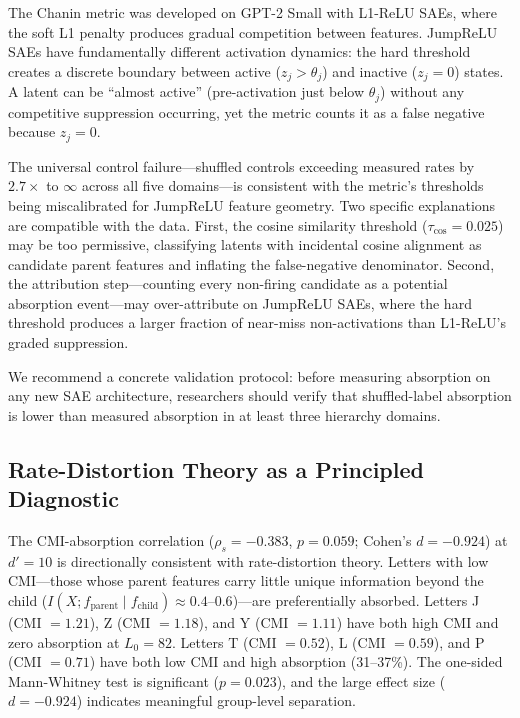 \documentclass{article}
\begin{document}
The Chanin metric was developed on GPT-2 Small with L1-ReLU SAEs, where the soft L1 penalty produces gradual competition between features. JumpReLU SAEs have fundamentally different activation dynamics: the hard threshold creates a discrete boundary between active ($z_j > \theta_j$) and inactive ($z_j = 0$) states. A latent can be ``almost active'' (pre-activation just below $\theta_j$) without any competitive suppression occurring, yet the metric counts it as a false negative because $z_j = 0$.

The universal control failure---shuffled controls exceeding measured rates by $2.7\times$ to $\infty$ across all five domains---is consistent with the metric's thresholds being miscalibrated for JumpReLU feature geometry. Two specific explanations are compatible with the data. First, the cosine similarity threshold ($\tau_{\cos} = 0.025$) may be too permissive, classifying latents with incidental cosine alignment as candidate parent features and inflating the false-negative denominator. Second, the attribution step---counting every non-firing candidate as a potential absorption event---may over-attribute on JumpReLU SAEs, where the hard threshold produces a larger fraction of near-miss non-activations than L1-ReLU's graded suppression.

We recommend a concrete validation protocol: before measuring absorption on any new SAE architecture, researchers should verify that shuffled-label absorption is lower than measured absorption in at least three hierarchy domains.

\subsection{Rate-Distortion Theory as a Principled Diagnostic}

The CMI-absorption correlation ($\rho_s = -0.383$, $p = 0.059$; Cohen's $d = -0.924$) at $d' = 10$ is directionally consistent with rate-distortion theory. Letters with low CMI---those whose parent features carry little unique information beyond the child ($I(X; f_{\text{parent}} \mid f_{\text{child}}) \approx 0.4$--$0.6$)---are preferentially absorbed. Letters J (CMI $= 1.21$), Z (CMI $= 1.18$), and Y (CMI $= 1.11$) have both high CMI and zero absorption at $L_0{=}82$. Letters T (CMI $= 0.52$), L (CMI $= 0.59$), and P (CMI $= 0.71$) have both low CMI and high absorption (31--37\%). The one-sided Mann-Whitney test is significant ($p = 0.023$), and the large effect size ($d = -0.924$) indicates meaningful group-level separation.
\end{document}

